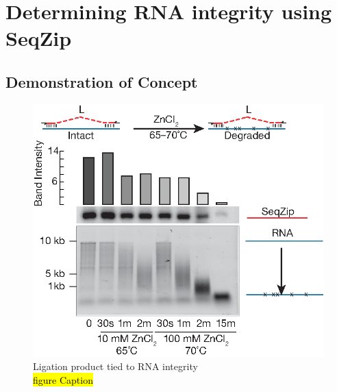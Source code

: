 \section{Determining RNA integrity using SeqZip}\label{sec: SeqZip Intergrity}

\subsection{Demonstration of Concept}

\begin{figure}[htbp]
	\centering 
	\includegraphics{Figures/Chapter2/DegreadedRNABySeqZip.eps}
	\caption[Ligation product tied to RNA integrity]
	{
		Ligation product tied to RNA integrity\\
		\hl{figure Caption}
	}
	\label{fig:Ligation product and RNA integrity}
\end{figure}

\lipsum[1-3]

